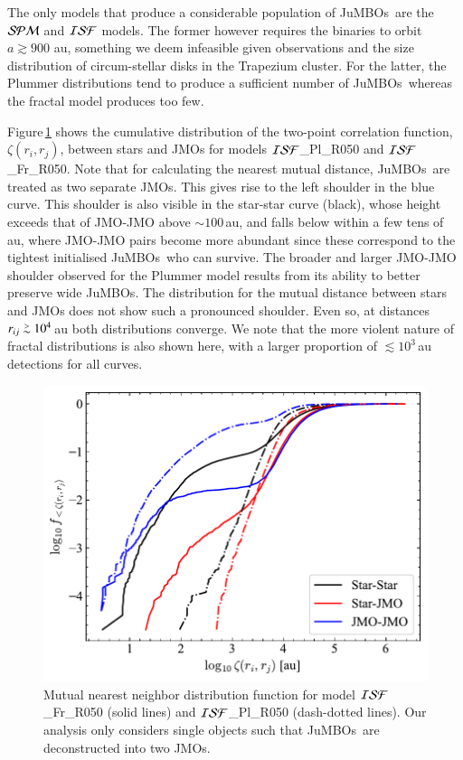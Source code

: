 \documentclass[submission,phys]{lib/SciPost}
\def\apgt{\ {\raise-.5ex\hbox{$\buildrel>\over\sim$}}\ }
\newcommand{\jumbos}{\mbox{JuMBOs}}
\begin{document}
The only models that produce a considerable population of \jumbos\,
are the ${\cal SPM}$ and ${\cal ISF}$ models. The former however
requires the binaries to orbit $a \gtrsim 900$ au, something we deem infeasible 
given observations and the size distribution of circum-stellar disks in the 
Trapezium cluster. For the latter, the Plummer distributions tend to produce 
a sufficient number of \jumbos\, whereas the fractal model produces too few.

Figure\,\ref{Fig:twopoint_correlation_ISF_Fr050} shows the cumulative
distribution of the two-point correlation function, $\zeta(r_i,r_j)$,
between stars and JMOs for models ${\cal ISF}$\_Pl\_R050 and ${\cal
  ISF}$\_Fr\_R050.  Note that for calculating the nearest mutual
distance, \jumbos\, are treated as two separate JMOs.  This gives rise
to the left shoulder in the blue curve. This shoulder is
also visible in the star-star curve (black), whose height exceeds that
of JMO-JMO above $\sim 100$\,au, and falls below within a few tens of
au, where JMO-JMO pairs become more abundant since these correspond to
the tightest initialised \jumbos\, who can survive.  The
broader and larger JMO-JMO shoulder observed for the Plummer model
results from its ability to better preserve wide JuMBOs. The
distribution for the mutual distance between stars and JMOs does not
show such a pronounced shoulder.  Even so, at distances $r_{ij} \apgt
10^4$\,au both distributions converge.  We note that the more violent
nature of fractal distributions is also shown here, with a larger
proportion of $\lesssim10^{3}$\,au detections for all curves.

\begin{figure}
    \centering
        \includegraphics[width=0.75\columnwidth]{figures/two_point_corr_rvir0.5_jmo.pdf}
        \caption{Mutual nearest neighbor distribution function for
          model ${\cal ISF}$\_Fr\_R050 (solid lines) and ${\cal
            ISF}$\_Pl\_R050 (dash-dotted lines). Our analysis only
          considers single objects such that \jumbos\, are
          deconstructed into two JMOs.}
        \label{Fig:twopoint_correlation_ISF_Fr050}
\end{figure}
\end{document}

